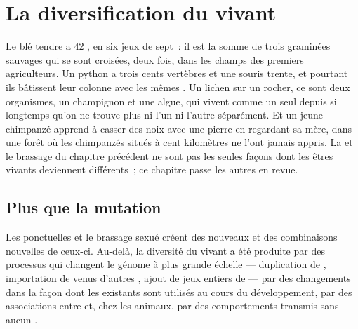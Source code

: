 \chapter{La diversification du vivant}\label{ch:g12:diversification-of-life}

Le blé tendre a 42 , en six jeux de sept~: il est la somme
de trois graminées sauvages qui se sont croisées, deux fois, dans les
champs des premiers agriculteurs. Un python a trois cents vertèbres et
une souris trente, et pourtant ils bâtissent leur colonne avec les
mêmes . Un lichen sur un rocher, ce sont deux organismes, un
champignon et une algue, qui vivent comme un seul depuis si longtemps
qu'on ne trouve plus ni l'un ni l'autre séparément. Et un jeune
chimpanzé apprend à casser des noix avec une pierre en regardant sa
mère, dans une forêt où les chimpanzés situés à cent kilomètres ne
l'ont jamais appris. La  et le brassage du chapitre précédent
ne sont pas les seules façons dont les êtres vivants deviennent
différents~; ce chapitre passe les autres en revue.

\section{Plus que la mutation}

\begin{proposition}\label{prop:g12:diversification-of-life:sources}
Les  ponctuelles et le brassage sexué créent des 
nouveaux et des combinaisons nouvelles de ceux-ci. Au-delà, la
diversité du vivant a été produite par des processus qui changent le
génome à plus grande échelle --- duplication de , importation de
 venus d'autres , ajout de jeux entiers de  ---
par des changements dans la façon dont les  existants sont
utilisés au cours du développement, par des associations entre 
et, chez les animaux, par des comportements transmis sans aucun .
\end{proposition}
\admitted

